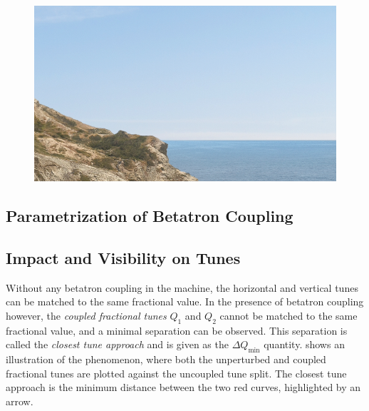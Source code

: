 \begin{figure}
    \begin{center}
    \includegraphics[width = 0.9\linewidth]{Figures/placeholder.png}
    \caption{}
    \label{figure:skew_quadrupole}
    \end{center}
\end{figure}

\subsection{Parametrization of Betatron Coupling}


\subsection{Impact and Visibility on Tunes}

Without any betatron coupling in the machine, the horizontal and vertical tunes can be matched to the same fractional value.
In the presence of betatron coupling however, the \emph{coupled fractional tunes} \(Q_1\) and \(Q_2\) cannot be matched to the same fractional value, and a minimal separation can be observed.
This separation is called the \emph{closest tune approach} and is given as the \(\Delta Q_{\mathrm{min}}\) quantity.
 shows an illustration of the phenomenon, where both the unperturbed and coupled fractional tunes are plotted against the uncoupled tune split.
The closest tune approach is the minimum distance between the two red curves, highlighted by an arrow.

